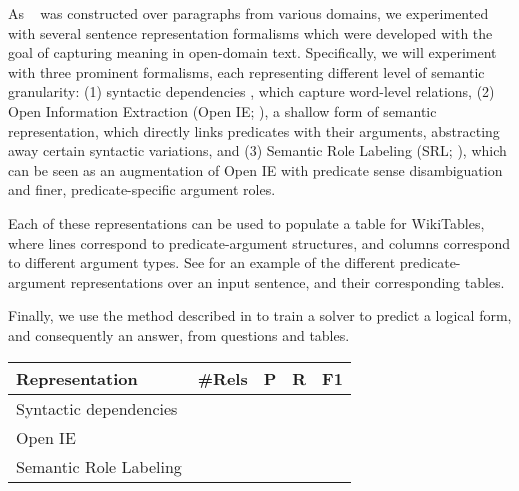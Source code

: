 As \drop~ was constructed over paragraphs from various domains,
we experimented with several sentence representation formalisms which were
developed with the goal of capturing meaning in open-domain text.
Specifically, we will experiment with three prominent formalisms, each
representing different level of semantic granularity:
(1) syntactic dependencies \cite{sd}, which capture word-level relations,
(2) Open Information Extraction (Open IE; \cite{oie}), a shallow
form of semantic representation, which directly links predicates
with their arguments, abstracting away certain syntactic variations, and
(3) Semantic Role Labeling (SRL; \cite{srl}), which can be seen as an
augmentation of Open IE with predicate sense disambiguation and finer, predicate-specific
argument roles.

Each of these representations can be used to populate a table for WikiTables,
where lines correspond to predicate-argument structures,
and columns correspond to different argument types.
See  for an example of the different predicate-argument
representations over an input sentence, and their corresponding tables.

Finally, we use the method described in \cite{Krishnamurthy2017neuralsp}
to train a solver to predict a logical form, and consequently an answer, from questions and tables.

\begin{table}[]
\begin{tabular}{@{}lllll@{}}
\toprule
Representation         & \#Rels & P & R & F1 \\ \midrule
Syntactic dependencies &             &           &        &    \\
Open IE                &             &           &        &    \\
Semantic Role Labeling  &             &           &        &    \\ \bottomrule
\end{tabular}
\end{table}
